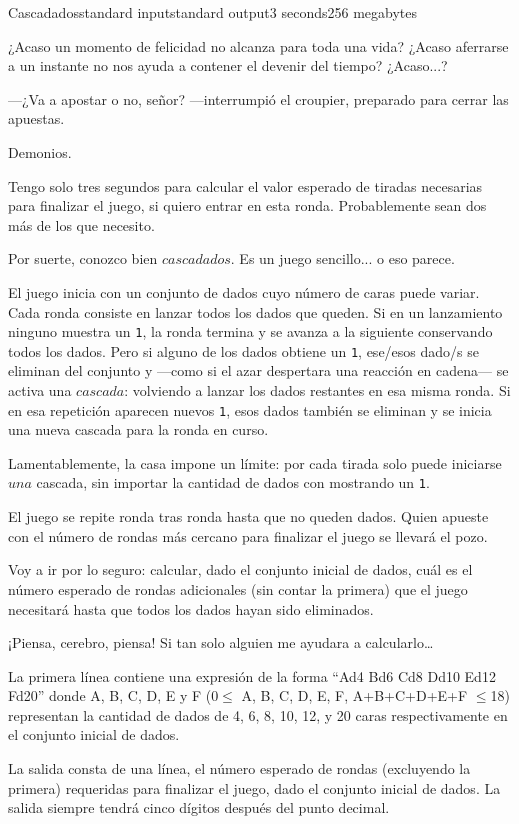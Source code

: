 \begin{problem}{Cascadados}{standard input}{standard output}{3 seconds}{256 megabytes}

¿Acaso un momento de felicidad no alcanza para toda una vida?
¿Acaso aferrarse a un instante no nos ayuda a contener el devenir del tiempo?
¿Acaso...?

---¿Va a apostar o no, señor? ---interrumpió el croupier, preparado para cerrar las apuestas. 

Demonios. 

Tengo solo tres segundos para calcular el valor esperado de tiradas necesarias para finalizar el juego, si quiero entrar en esta ronda. Probablemente sean dos más de los que necesito.

Por suerte, conozco bien $cascadados$. Es un juego sencillo... o eso parece.

El juego inicia con un conjunto de dados cuyo número de caras puede variar. Cada ronda consiste en lanzar todos los dados que queden. Si en un lanzamiento ninguno muestra un \texttt{1}, la ronda termina y se avanza a la siguiente conservando todos los dados. Pero si alguno de los dados obtiene un \texttt{1}, ese/esos dado/s se eliminan del conjunto y ---como si el azar despertara una reacción en cadena--- se activa una $cascada$: volviendo a lanzar los dados restantes en esa misma ronda. Si en esa repetición aparecen nuevos \texttt{1}, esos dados también se eliminan y se inicia una nueva cascada para la ronda en curso.

Lamentablemente, la casa impone un límite: por cada tirada solo puede iniciarse $una$ cascada, sin importar la cantidad de dados con mostrando un \texttt{1}.

El juego se repite ronda tras ronda hasta que no queden dados. Quien apueste con el número de rondas más cercano para finalizar el juego se llevará el pozo.

Voy a ir por lo seguro: calcular, dado el conjunto inicial de dados, cuál es el número esperado de rondas adicionales (sin contar la primera) que el juego necesitará hasta que todos los dados hayan sido eliminados.

¡Piensa, cerebro, piensa! Si tan solo alguien me ayudara a calcularlo…




\InputFile
La primera línea contiene una expresión de la forma ``Ad4 Bd6 Cd8 Dd10 Ed12 Fd20'' donde A, B, C, D, E y F (0$\leq$ A, B, C, D, E, F, A+B+C+D+E+F $\leq$18) representan la cantidad de dados de 4, 6, 8, 10, 12, y 20 caras respectivamente en el conjunto inicial de dados.

\OutputFile
La salida consta de una línea, el número esperado de rondas (excluyendo la primera) requeridas para finalizar el juego, dado el conjunto inicial de dados. La salida siempre tendrá cinco dígitos después del punto decimal.

\Examples

\begin{example}
%
%
%
\end{example}

\end{problem}


